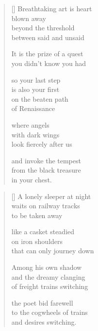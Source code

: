 \documentclass[14pt]{extbook}
\newcommand{\clearemptydoublepage}{\newpage{\pagestyle{empty}\cleardoublepage}}
\newcommand*{\centeredornament}{\centerline{\pgfornament[width=6cm]{88}}}
\begin{document}

\newpage

\vspace*{-15mm}
\centeredornament
\vspace*{-7mm}


\settowidth{\versewidth}{you didn't know you had}

\begin{verse}[\versewidth]
  Breathtaking art is heart \\
  blown away \\
  beyond the threshold \\
  between said and unsaid

  It is the prize of a quest \\
  you didn't know you had

  so your last step \\
  is also your first \\
  on the beaten path \\
  of Renaissance

  where angels \\
  with dark wings \\
  look fiercely after us

  and invoke the tempest \\
  from the black treasure \\
  in your chest.
\end{verse}


\newpage

\vspace*{-15mm}
\centeredornament
\vspace*{-7mm}


\settowidth{\versewidth}{that can only journey down}

\begin{verse}[\versewidth]
  A lonely sleeper at night \\
  waits on railway tracks \\
  to be taken away

  like a casket steadied \\
  on iron shoulders \\
  that can only journey down

  Among his own shadow \\
  and the dreamy clanging \\
  of freight trains switching

  the poet bid farewell \\
  to the cogwheels of trains \\
  and desires switching.
\end{verse}


\thispagestyle{empty} \ \clearemptydoublepage
\thispagestyle{empty} \ \clearemptydoublepage
\end{document}
